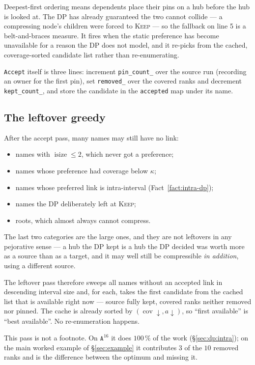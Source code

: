 \documentclass[11pt,a4paper]{article}
\theoremstyle{definition}
\theoremstyle{plain}
\theoremstyle{remark}
\newcommand{\cov}{\operatorname{cov}}
\newcommand{\isize}{\operatorname{isize}}
\newcommand{\KEEP}{\textnormal{\textsc{Keep}}}
\begin{document}
Deepest-first ordering means dependents place their pins on a hub before
the hub is looked at. The DP has already guaranteed the two cannot
collide --- a compressing node's children were forced to \KEEP{} --- so
the fallback on line 5 is a belt-and-braces measure. It fires when the
static preference has become unavailable for a reason the DP does not
model, and it re-picks from the cached, coverage-sorted candidate list
rather than re-enumerating.

\texttt{Accept} itself is three lines: increment \texttt{pin\_count\_}
over the source run (recording an owner for the first pin), set
\texttt{removed\_} over the covered ranks and decrement
\texttt{kept\_count\_}, and store the candidate in the \texttt{accepted}
map under its name.

\subsection{The leftover greedy}
\label{sec:leftover}

After the accept pass, many names may still have no link:

\begin{itemize}
\item names with $\isize \le 2$, which never got a preference;
\item names whose preference had coverage below $\kappa$;
\item names whose preferred link is intra-interval
  (Fact~\ref{fact:intra-dp});
\item names the DP deliberately left at \KEEP{};
\item roots, which almost always cannot compress.
\end{itemize}

The last two categories are the large ones, and they are not
leftovers in any pejorative sense --- a hub the DP kept is a hub the DP
decided was worth more as a source than as a target, and it may well
still be compressible \emph{in addition}, using a different source.

The leftover pass therefore sweeps all names without an accepted link in
descending interval size and, for each, takes the first candidate from
the cached list that is available right now --- source fully kept, covered
ranks neither removed nor pinned. The cache is already sorted by
$(\cov \downarrow, a \downarrow)$, so ``first available'' is ``best
available''. No re-enumeration happens.

This pass is not a footnote. On $\mathtt{A}^{16}$ it does $100\,\%$ of
the work (\S\ref{sec:dp:intra}); on the main worked example of
\S\ref{sec:example} it contributes $3$ of the $10$ removed ranks and is
the difference between the optimum and missing it.
\end{document}
